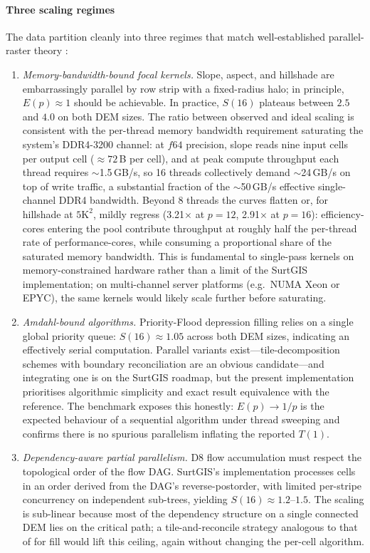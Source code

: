 \documentclass[preprint,review,12pt,authoryear]{elsarticle}
\begin{document}
\paragraph{Three scaling regimes} The data partition cleanly into three regimes that match well-established parallel-raster theory \citep{guan2010prpl, miao2017prplgtiol}:

\begin{enumerate}
    \item \emph{Memory-bandwidth-bound focal kernels.} Slope, aspect, and hillshade are embarrassingly parallel by row strip with a fixed-radius halo; in principle, $E(p) \approx 1$ should be achievable. In practice, $S(16)$ plateaus between $2.5$ and $4.0$ on both DEM sizes. The ratio between observed and ideal scaling is consistent with the per-thread memory bandwidth requirement saturating the system's DDR4-3200 channel: at $f64$ precision, slope reads nine input cells per output cell ($\approx 72$\,B per cell), and at peak compute throughput each thread requires $\sim$1.5\,GB/s, so 16 threads collectively demand $\sim$24\,GB/s on top of write traffic, a substantial fraction of the $\sim$50\,GB/s effective single-channel DDR4 bandwidth. Beyond 8 threads the curves flatten or, for hillshade at $5\text{K}^2$, mildly regress (3.21$\times$ at $p{=}12$, 2.91$\times$ at $p{=}16$): efficiency-cores entering the pool contribute throughput at roughly half the per-thread rate of performance-cores, while consuming a proportional share of the saturated memory bandwidth. This is fundamental to single-pass kernels on memory-constrained hardware rather than a limit of the SurtGIS implementation; on multi-channel server platforms (e.g.\ NUMA Xeon or EPYC), the same kernels would likely scale further before saturating.

    \item \emph{Amdahl-bound algorithms.} Priority-Flood depression filling \citep{barnes2014} relies on a single global priority queue: $S(16) \approx 1.05$ across both DEM sizes, indicating an effectively serial computation. Parallel variants exist---tile-decomposition schemes with boundary reconciliation \citep{barnes2017} are an obvious candidate---and integrating one is on the SurtGIS roadmap, but the present implementation prioritises algorithmic simplicity and exact result equivalence with the reference. The benchmark exposes this honestly: $E(p) \to 1/p$ is the expected behaviour of a sequential algorithm under thread sweeping and confirms there is no spurious parallelism inflating the reported $T(1)$.

    \item \emph{Dependency-aware partial parallelism.} D8 flow accumulation must respect the topological order of the flow DAG. SurtGIS's implementation processes cells in an order derived from the DAG's reverse-postorder, with limited per-stripe concurrency on independent sub-trees, yielding $S(16) \approx 1.2$--$1.5$. The scaling is sub-linear because most of the dependency structure on a single connected DEM lies on the critical path; a tile-and-reconcile strategy analogous to that of \citet{barnes2017} for fill would lift this ceiling, again without changing the per-cell algorithm.
\end{enumerate}
\end{document}
